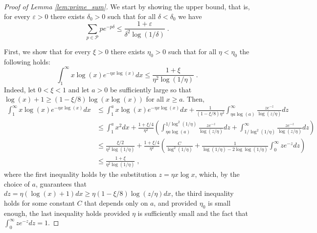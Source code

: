 \documentclass[10pt,a4paper]{amsart}
\begin{document}
\begin{proof}[Proof of Lemma \ref{lem:prime_sum}]
We start by showing the upper bound, that is, for every $\varepsilon>0$ there exists $\delta_0>0$ such that for all $\delta<\delta_0$ we have
\[
    \sum_{p\in\mathcal{P}}pe^{-p\delta}\leq \frac{1+\varepsilon}{\delta^2\log(1/\delta)}\;.
\]

First, we show that for every $\xi>0$ there exists $\eta_0>0$ such that for all $\eta<\eta_0$ the following holds:
\begin{equation}\label{eq:evaluating_the_integral_primes_upper}
        \int_{1}^{\infty}x\log(x)e^{-\eta x\log(x)}dx\leq \frac{1+\xi}{\eta^2\log(1/\eta)}\;.
\end{equation}
Indeed, let $0<\xi<1$ and let $a>0$ be sufficiently large so that $\log(x)+1\geq (1-\xi/8)\log(x\log(x))$ for all $x\geq a$. Then,
\begin{align*}\label{eq:evaluation_with_integral}
    \int_{1}^{\infty}x\log(x)e^{-\eta x\log(x)}dx &\leq \int_{1}^{a}x\log(x)e^{-\eta x\log(x)}dx+\frac{1}{(1-\xi/8)\eta^2}\int_{\eta a\log(a)}^{\infty}\frac{z e^{-z}}{\log(z/\eta)}dz\nonumber\\
    &\leq \int_{1}^{a}x^2dx+\frac{1+\xi/4}{\eta^2}\left(\int_{\eta a\log(a)}^{1/\log^2(1/\eta)}\frac{ze^{-z}}{\log(z/\eta)}dz+\int_{1/\log^2(1/\eta)}^{\infty}\frac{ze^{-z}}{\log(z/\eta)}dz\right)\nonumber\\
    &\leq \frac{\xi/2}{\eta^2\log(1/\eta)}+\frac{1+\xi/4}{\eta^2}\left(\frac{C}{\log^2(1/\eta)}+\frac{1}{\log(1/\eta)-2\log\log(1/\eta)}\int_{0}^{\infty}ze^{-z}dz\right)\\
    &\leq \frac{1+\xi}{\eta^2\log(1/\eta)}\;,
\end{align*}
where the first inequality holds by the substitution $z=\eta x \log x$, which, by the choice of $a$, guarantees that
$dz=\eta(\log(x)+1)dx\geq \eta(1-\xi/8)\log(z/\eta)dx$, the third inequality holds for some constant $C$ that depends only on $a$, and provided $\eta_0$ is small enough, the last inequality holds provided $\eta$ is sufficiently small and the fact that $\int_{0}^{\infty}ze^{-z}dz=1$.


\end{proof}
\end{document}
